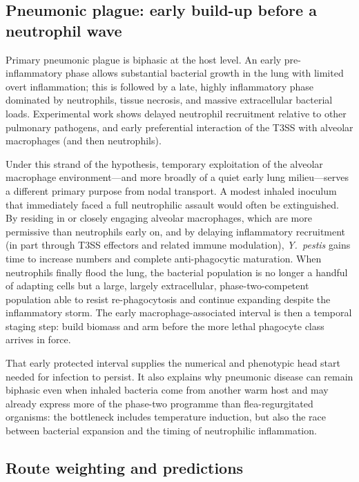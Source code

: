 \documentclass[11pt,a4paper]{article}
\begin{document}
\subsection{Pneumonic plague: early build-up before a neutrophil wave}

Primary pneumonic plague is biphasic at the host level. An early pre-inflammatory phase allows substantial bacterial growth in the lung with limited overt inflammation; this is followed by a late, highly inflammatory phase dominated by neutrophils, tissue necrosis, and massive extracellular bacterial loads. Experimental work shows delayed neutrophil recruitment relative to other pulmonary pathogens, and early preferential interaction of the T3SS with alveolar macrophages (and then neutrophils).

Under this strand of the hypothesis, temporary exploitation of the alveolar macrophage environment---and more broadly of a quiet early lung milieu---serves a different primary purpose from nodal transport. A modest inhaled inoculum that immediately faced a full neutrophilic assault would often be extinguished. By residing in or closely engaging alveolar macrophages, which are more permissive than neutrophils early on, and by delaying inflammatory recruitment (in part through T3SS effectors and related immune modulation), \textit{Y.\ pestis} gains time to increase numbers and complete anti-phagocytic maturation. When neutrophils finally flood the lung, the bacterial population is no longer a handful of adapting cells but a large, largely extracellular, phase-two-competent population able to resist re-phagocytosis and continue expanding despite the inflammatory storm. The early macrophage-associated interval is then a temporal staging step: build biomass and arm before the more lethal phagocyte class arrives in force.

That early protected interval supplies the numerical and phenotypic head start needed for infection to persist. It also explains why pneumonic disease can remain biphasic even when inhaled bacteria come from another warm host and may already express more of the phase-two programme than flea-regurgitated organisms: the bottleneck includes temperature induction, but also the race between bacterial expansion and the timing of neutrophilic inflammation.

\subsection{Route weighting and predictions}
\end{document}
